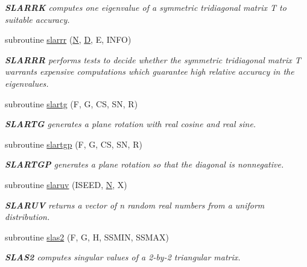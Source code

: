 \begin{DoxyCompactItemize}
\begin{DoxyCompactList}\small\item\em {\bfseries S\+L\+A\+R\+R\+K} computes one eigenvalue of a symmetric tridiagonal matrix T to suitable accuracy. \end{DoxyCompactList}\item 
subroutine \hyperlink{group__auxOTHERauxiliary_ga37c1c1075019c75d8975e952a09516d5}{slarrr} (\hyperlink{polmisc_8c_a0240ac851181b84ac374872dc5434ee4}{N}, \hyperlink{odrpack_8h_a7dae6ea403d00f3687f24a874e67d139}{D}, E, I\+N\+F\+O)
\begin{DoxyCompactList}\small\item\em {\bfseries S\+L\+A\+R\+R\+R} performs tests to decide whether the symmetric tridiagonal matrix T warrants expensive computations which guarantee high relative accuracy in the eigenvalues. \end{DoxyCompactList}\item 
subroutine \hyperlink{group__auxOTHERauxiliary_gaee6602fc79f90ffd7113154b87088302}{slartg} (F, G, C\+S, S\+N, R)
\begin{DoxyCompactList}\small\item\em {\bfseries S\+L\+A\+R\+T\+G} generates a plane rotation with real cosine and real sine. \end{DoxyCompactList}\item 
subroutine \hyperlink{group__auxOTHERauxiliary_gaf196d96b7826d09326521d4a30b4bca4}{slartgp} (F, G, C\+S, S\+N, R)
\begin{DoxyCompactList}\small\item\em {\bfseries S\+L\+A\+R\+T\+G\+P} generates a plane rotation so that the diagonal is nonnegative. \end{DoxyCompactList}\item 
subroutine \hyperlink{group__auxOTHERauxiliary_ga5ca61f3556928fc2698683460395d96c}{slaruv} (I\+S\+E\+E\+D, \hyperlink{polmisc_8c_a0240ac851181b84ac374872dc5434ee4}{N}, X)
\begin{DoxyCompactList}\small\item\em {\bfseries S\+L\+A\+R\+U\+V} returns a vector of n random real numbers from a uniform distribution. \end{DoxyCompactList}\item 
subroutine \hyperlink{group__auxOTHERauxiliary_ga7047efd8096db5f0724f79cad80e4127}{slas2} (F, G, H, S\+S\+M\+I\+N, S\+S\+M\+A\+X)
\begin{DoxyCompactList}\small\item\em {\bfseries S\+L\+A\+S2} computes singular values of a 2-\/by-\/2 triangular matrix. \end{DoxyCompactList}\item 

\end{DoxyCompactItemize}
